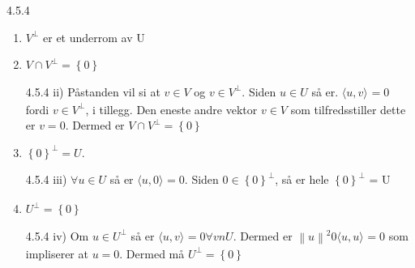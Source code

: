 \documentclass[a4paper,norsk]{article}
\begin{document}
\begin{oppgavebox}{4.5.4}{}

\begin{enumerate}
    \item $ V^{\bot} $ er et underrom av U
    \item $ V \cap V^{\bot} = \left\{ 0 \right\} $
    \begin{proofbox}{4.5.4 ii)}
        Påstanden vil si at $ v \in V $ og $ v \in V^{\bot} $. Siden $ u\in U $ så er. $ \langle u, v \rangle_{  } =0 $ fordi $ v \in V^{\bot} $, i tillegg. Den eneste andre vektor $ v\in V $ som tilfredsstiller dette er $ v=0 $. Dermed er $ V \cap V^{\bot} = \left\{ 0 \right\}  $        
    \end{proofbox}
    \item $ \left\{ 0 \right\}^{\bot} = U $. 
    \begin{proofbox}{4.5.4 iii)}{}
        $ \forall u \in U $ så er $ \langle u, 0 \rangle_{  } =0 $. Siden $ 0 \in \left\{ 0 \right\}^{\bot}  $, så er hele $ \left\{ 0 \right\}^{\bot}  $ = U    
    \end{proofbox}
    \item $ U^{\bot} = \left\{ 0 \right\}  $ 
    \begin{proofbox}{4.5.4 iv)}{}
        Om $ u \in U^{\bot} $ så er $ \langle u, v \rangle_{  } =0  \forall v n U$. Dermed er $ \left\lVert u \right\rVert ^2 0 \langle u, u \rangle_{  } =0$ som impliserer at $ u=0 $. Dermed må $ U^{\bot} = \left\{ 0 \right\}  $     
    \end{proofbox}
\end{enumerate}

\end{oppgavebox}
\end{document}
